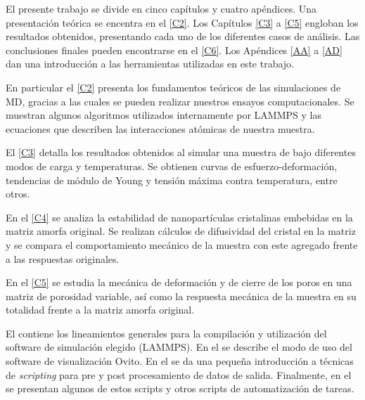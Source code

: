 El presente trabajo se divide en cinco capítulos y cuatro apéndices. Una presentación teórica se encentra en el \cref{C2}. Los Capítulos \ref{C3} a \ref{C5} engloban los resultados obtenidos, presentando cada uno de los diferentes casos de análisis. Las conclusiones finales pueden encontrarse en el \cref{C6}. Los Apéndices \ref{AA} a \ref{AD} dan una introducción a las herramientas utilizadas en este trabajo.

En particular el \cref{C2} presenta los fundamentos teóricos de las simulaciones de MD, gracias a las cuales se pueden realizar nuestros ensayos computacionales. Se muestran algunos algoritmos utilizados internamente por LAMMPS y las ecuaciones que describen las interacciones atómicas de nuestra muestra.

El \cref{C3} detalla los resultados obtenidos al simular una muestra de \CuZr bajo diferentes modos de carga y temperaturas. Se obtienen curvas de esfuerzo-deformación, tendencias de módulo de Young y tensión máxima contra temperatura, entre otros.

En el \cref{C4} se analiza la estabilidad de nanopartículas cristalinas embebidas en la matriz amorfa original. Se realizan cálculos de difusividad del cristal en la matriz y se compara el comportamiento mecánico de la muestra con este agregado frente a las respuestas originales.

En el \cref{C5} se estudia la mecánica de deformación y de cierre de los poros en una matriz de porosidad variable, así como la respuesta mecánica de la muestra en su totalidad frente a la matriz amorfa original. 

El  contiene los lineamientos generales para la compilación y utilización del software de simulación elegido (LAMMPS). En el  se describe el modo de uso del software de visualización Ovito. En el  se da una pequeña introducción a técnicas de \textit{scripting} para pre y post procesamiento de datos de salida. Finalmente, en el  se presentan algunos de estos scripts y otros scripts de automatización de tareas.